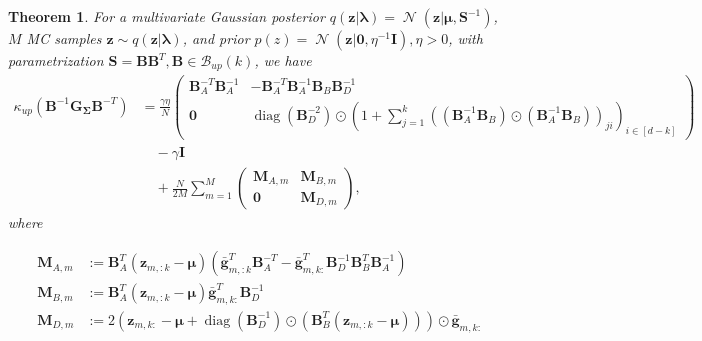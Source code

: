 \documentclass[a4paper, 11pt, oneside]{scrartcl}
\theoremstyle{break}
\newtheorem{theorem}[lemma]{Theorem}
\DeclareMathOperator{\Normal}{\mathcal{N}}
\DeclareMathOperator{\diag}{diag}
\newcommand{\matr}[1]{\boldsymbol{#1}}
\newcommand{\set}[1]{\mathcal{#1}}
\numberwithin{equation}{section}
\begin{document}
					\begin{theorem}
						For a multivariate Gaussian posterior $q(\matr{z} | \matr{\lambda}) = \Normal(\matr{z} | \matr{\mu}, \matr{S}^{-1})$, $M$ MC samples $\matr{z} \sim q(\matr{z} | \matr{\lambda})$, and prior $p(z) = \Normal(\matr{z} | \matr{0}, \eta^{-1} \matr{I}), \eta > 0$, with parametrization $\matr{S} = \matr{B} \matr{B}^T, \matr{B} \in \set{B}_{up}(k)$, we have
						\begin{align*}
							\kappa_{up}(\matr{B}^{-1} \matr{G_{\Sigma}} \matr{B}^{-T}) &= \frac{\gamma \eta}{N}\begin{pmatrix} \matr{B}_A^{-T} \matr{B}_A^{-1} & -\matr{B}_A^{-T} \matr{B}_A^{-1} \matr{B}_B \matr{B}_D^{-1} \\ \matr{0} & \diag(\matr{B}_D^{-2}) \odot (1 + \sum_{j=1}^k ((\matr{B}_A^{-1} \matr{B}_B) \odot (\matr{B}_A^{-1} \matr{B}_B))_{ji})_{i \in [d-k]} \end{pmatrix} \\
							&\quad - \gamma \matr{I} \\
							&\quad + \frac{N}{2 M} \sum_{m=1}^M \begin{pmatrix} \matr{M}_{A, m} & \matr{M}_{B, m} \\ \matr{0} & \matr{M}_{D, m} \end{pmatrix},
						\end{align*}
						where 

						\begin{align*}
							\matr{M}_{A, m} &:= \matr{B}_A^T (\matr{z}_{m, :k} - \matr{\mu}) (\matr{\bar{g}}_{m, :k}^T \matr{B}_A^{-T} - \matr{\bar{g}}_{m, k:}^T \matr{B}_D^{-1} \matr{B}_B^T \matr{B}_A^{-1} ) \\
							\matr{M}_{B, m} &:= \matr{B}_A^T (\matr{z}_{m, :k} - \matr{\mu}) \matr{\bar{g}}_{m, k:}^T \matr{B}_D^{-1} \\
							\matr{M}_{D, m} &:= 2(\matr{z}_{m, k:} - \matr{\mu} + \diag(\matr{B}_D^{-1}) \odot (\matr{B}_B^T (\matr{z}_{m, :k} - \matr{\mu}))) \odot \matr{\bar{g}}_{m, k:}
						\end{align*}
					\end{theorem}
\end{document}
